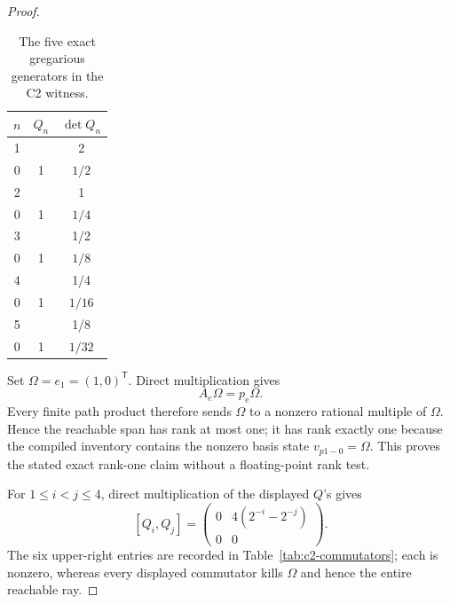 \documentclass[11pt]{article}
\theoremstyle{definition}
\theoremstyle{remark}
\begin{document}
\begin{proof}
\begin{table}[ht]
\centering
\caption{The five exact gregarious generators in the C2 witness.}
\label{tab:c2-q-matrices}
\begin{tabular}{c c c}
\toprule
\(n\) & \(Q_n\) & \(\det Q_n\)\\
\midrule
1 & \(\left(\begin{smallmatrix}1/2&2\\0&1\end{smallmatrix}\right)\) & \(1/2\)\\
2 & \(\left(\begin{smallmatrix}1/4&1\\0&1\end{smallmatrix}\right)\) & \(1/4\)\\
3 & \(\left(\begin{smallmatrix}1/8&1/2\\0&1\end{smallmatrix}\right)\) & \(1/8\)\\
4 & \(\left(\begin{smallmatrix}1/16&1/4\\0&1\end{smallmatrix}\right)\) & \(1/16\)\\
5 & \(\left(\begin{smallmatrix}1/32&1/8\\0&1\end{smallmatrix}\right)\) & \(1/32\)\\
\bottomrule
\end{tabular}
\end{table}

Set \(\Omega=e_1=(1,0)^{\mathsf T}\).  Direct multiplication gives
\[
  A_e\Omega=p_e\Omega .
\]
Every finite path product therefore sends \(\Omega\) to a nonzero rational
multiple of \(\Omega\).  Hence the reachable span has rank at most one; it
has rank exactly one because the compiled inventory contains the nonzero
basis state \(v_{p1-0}=\Omega\).  This proves the stated exact rank-one
claim without a floating-point rank test.

For \(1\leq i<j\leq4\), direct multiplication of the displayed \(Q\)'s gives
\[
 [Q_i,Q_j]
 =\begin{pmatrix}
    0&4(2^{-i}-2^{-j})\\0&0
  \end{pmatrix}.
\]
The six upper-right entries are recorded in
Table~\ref{tab:c2-commutators}; each is nonzero, whereas every displayed
commutator kills \(\Omega\) and hence the entire reachable ray.


\end{proof}
\end{document}
